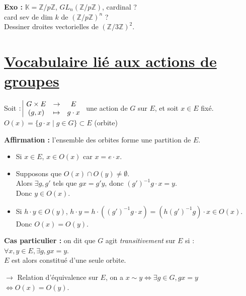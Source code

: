 \noindent \textbf{Exo :} $\mathbb{K} = \mathbb{Z}/p\mathbb{Z}$, $GL_n(\mathbb{Z}/p\mathbb{Z})$, cardinal ? \\
card sev de dim $k$ de $(\mathbb{Z}/p\mathbb{Z})^n$ ? \\
Dessiner droites vectorielles de $(\mathbb{Z}/3\mathbb{Z})^2$.

\vspace{0.5cm}

\section*{\underline{Vocabulaire lié aux actions de groupes}}

Soit $: \space \begin{array}{|ccc} \displaystyle G \times E & \to & \displaystyle E \\ \displaystyle (g, x) & \mapsto & \displaystyle g\cdot x \end{array}$ une action de $G$ sur $E$, et soit $x \in E$ fixé. \\


 $O(x) = \{ g \cdot x \mid g \in G \} \subset E$ (orbite)

\vspace{0.3cm}

\noindent \textbf{Affirmation :} l'ensemble des orbites forme une partition de $E$.
\begin{itemize}
    \item Si $x \in E$, $x \in O(x)$ car $x = e \cdot x$.
    \item Supposons que $O(x) \cap O(y) \neq \emptyset$. \\
    Alors $\exists g, g'$ tels que $gx = g'y$, donc $(g')^{-1}g \cdot x = y$. \\
    Donc $y \in O(x)$.
    \item Si $h \cdot y \in O(y)$, $h \cdot y = h \cdot ((g')^{-1}g \cdot x) = (h (g')^{-1} g) \cdot x \in O(x)$. \\
    Donc $O(x) = O(y)$.
\end{itemize}

\vspace{0.3cm}

\noindent \textbf{Cas particulier :} on dit que $G$ agit \textit{transitivement} sur $E$ si : \\
$\forall x, y \in E, \exists g, g x = y$. \\
$E$ est alors constitué d'une seule orbite.

\vspace{0.3cm}

$\to$ Relation d'équivalence sur $E$, on a $x \sim y \iff \exists g \in G, gx = y$ \\
\hspace*{6cm} $\iff O(x) = O(y)$.

